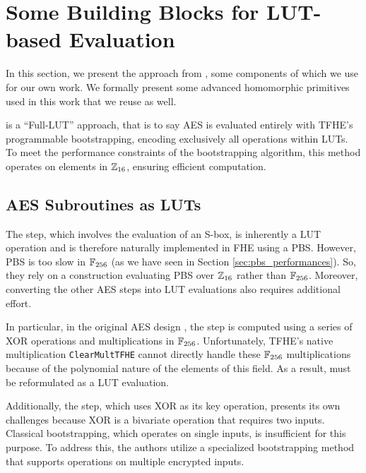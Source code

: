 
\section{Some Building Blocks for \acrshort{LUT}-based Evaluation}
\label{sec:previous-blocks}


In this section, we present the approach from \cite{DBLP:conf/wahc/TramaCBS23}, some components of which we use for our own work. We formally present some advanced homomorphic primitives used in this work that we reuse as well.


\cite{DBLP:conf/wahc/TramaCBS23} is a ``Full-\gls{LUT}'' approach, that is to say \gls{AES} is evaluated entirely with \gls{TFHE}'s programmable bootstrapping, encoding exclusively all operations within LUTs. To meet the performance constraints of the bootstrapping algorithm, this method operates on elements in $\mathbb{Z}_{16}$, ensuring efficient computation.

\subsection{AES Subroutines as LUTs}

The \SubBytes step, which involves the evaluation of an \gls{S-box}, is inherently a \gls{LUT} operation and is therefore naturally implemented in \gls{FHE} using a \gls{PBS}. However, \gls{PBS} is too slow in $\mathbb{F}_{256}$ (as we have seen in Section \ref{sec:pbs_performances}). So, they rely on a construction evaluating \gls{PBS} over $\mathbb{Z}_{16}$ rather than $\mathbb{F}_{256}$. Moreover, converting the other \gls{AES} steps into \gls{LUT} evaluations also requires additional effort.

In particular, in the original \gls{AES} design \cite{aes-original}, the \MixColumns step is computed using a series of XOR operations and multiplications in $\mathbb{F}_{256}$. Unfortunately, \gls{TFHE}’s native multiplication \texttt{ClearMultTFHE} cannot directly handle these $\mathbb{F}_{256}$ multiplications because of the polynomial nature of the elements of this field. As a result, \MixColumns must be reformulated as a \gls{LUT} evaluation.

Additionally, the \AddRoundKey step, which uses XOR as its key operation, presents its own challenges because XOR is a bivariate operation that requires two inputs. Classical bootstrapping, which operates on single inputs, is insufficient for this purpose. To address this, the authors utilize a specialized bootstrapping method that supports operations on multiple encrypted inputs.

